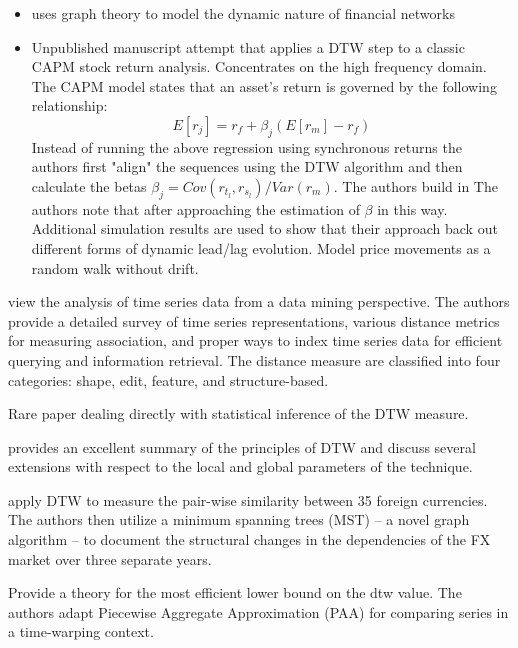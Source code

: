 \documentclass[12pt]{article}
\begin{document}
\begin{enumerate}
\begin{itemize}
        \item \parencite{9145837_Entropic_DTW_Fin_Networks} uses graph theory to model the dynamic nature of financial networks
        \item \parencite{HowardTalisAlexeev_2020} Unpublished manuscript attempt that applies a DTW step to a classic CAPM stock return analysis. Concentrates on the high frequency domain. The CAPM model states that an asset's return is governed by the following relationship:
        \begin{equation}
            E[r_{j}] = r_{f} + \beta_{j} (E[r_{m}] - r_{f})
        \end{equation}
        Instead of running the above regression using  synchronous returns the authors first "align" the sequences using the DTW algorithm and then calculate the betas $\beta_{j} = Cov(r_{t_{l}}, r_{s_{l}}) / Var(r_{m})$. The authors build in The authors note that after approaching the estimation of $\beta$ in this way. Additional simulation results are used to show that their approach back out different forms of dynamic lead/lag evolution. Model price movements as a random walk without drift.
    \end{itemize}
\end{enumerate}

\parencite{ElsingAgon2012} view the analysis of time series data from a data mining perspective. The authors provide a detailed survey of time series representations, various distance metrics for measuring association, and proper ways to index time series data for efficient querying and information retrieval. The distance measure are classified into four categories: shape, edit, feature, and structure-based.

\parencite{DuyTakeuchi2023statistical} Rare paper dealing directly with statistical inference of the DTW measure.

\parencite{Mueller2007} provides an excellent summary of the principles of DTW and discuss several extensions with respect to the local and global parameters of the technique.

\parencite{WangXieHanSun2012} apply DTW to measure the pair-wise similarity between 35 foreign currencies. The authors then utilize a minimum spanning trees (MST) -- a novel graph algorithm -- to document the structural changes in the dependencies of the FX market over three separate years.



\parencite{KeoghRatanamahatana_2005} Provide a theory for the most efficient lower bound on the dtw value. The authors adapt Piecewise Aggregate Approximation (PAA) for comparing series in a time-warping context.
\end{document}
